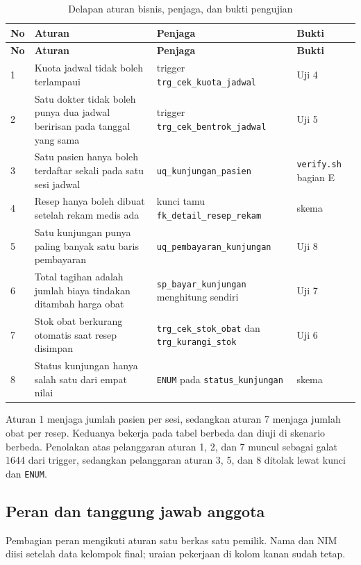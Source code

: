 \documentclass[12pt,a4paper]{article}
\begin{document}
\begin{longtable}{@{}p{0.7cm}p{6.1cm}p{4.4cm}p{3.2cm}@{}}
\caption{Delapan aturan bisnis, penjaga, dan bukti pengujian}
\label{tab:aturan}\\
\toprule
\textbf{No} & \textbf{Aturan} & \textbf{Penjaga} & \textbf{Bukti} \\
\midrule
\endfirsthead
\toprule
\textbf{No} & \textbf{Aturan} & \textbf{Penjaga} & \textbf{Bukti} \\
\midrule
\endhead
1 & Kuota jadwal tidak boleh terlampaui & trigger \texttt{trg\_cek\_kuota\_jadwal} & Uji 4 \\
2 & Satu dokter tidak boleh punya dua jadwal beririsan pada tanggal yang sama & trigger \texttt{trg\_cek\_bentrok\_jadwal} & Uji 5 \\
3 & Satu pasien hanya boleh terdaftar sekali pada satu sesi jadwal & \texttt{uq\_kunjungan\_pasien} & \texttt{verify.sh} bagian E \\
4 & Resep hanya boleh dibuat setelah rekam medis ada & kunci tamu \texttt{fk\_detail\_resep\_rekam} & skema \\
5 & Satu kunjungan punya paling banyak satu baris pembayaran & \texttt{uq\_pembayaran\_kunjungan} & Uji 8 \\
6 & Total tagihan adalah jumlah biaya tindakan ditambah harga obat & \texttt{sp\_bayar\_kunjungan} menghitung sendiri & Uji 7 \\
7 & Stok obat berkurang otomatis saat resep disimpan & \texttt{trg\_cek\_stok\_obat} dan \texttt{trg\_kurangi\_stok} & Uji 6 \\
8 & Status kunjungan hanya salah satu dari empat nilai & \texttt{ENUM} pada \texttt{status\_kunjungan} & skema \\
\bottomrule
\end{longtable}

Aturan 1 menjaga jumlah pasien per sesi, sedangkan aturan 7 menjaga jumlah obat
per resep. Keduanya bekerja pada tabel berbeda dan diuji di skenario berbeda.
Penolakan atas pelanggaran aturan 1, 2, dan 7 muncul sebagai galat 1644 dari
trigger, sedangkan pelanggaran aturan 3, 5, dan 8 ditolak lewat kunci dan
\texttt{ENUM}.

\subsection{Peran dan tanggung jawab anggota}

Pembagian peran mengikuti aturan satu berkas satu pemilik. Nama dan NIM diisi
setelah data kelompok final; uraian pekerjaan di kolom kanan sudah tetap.
\end{document}
